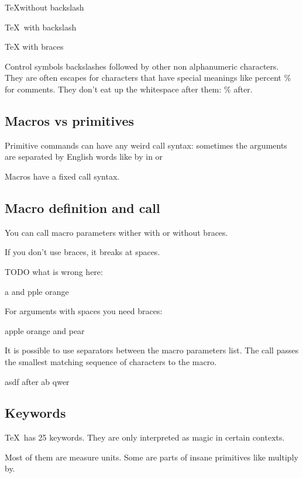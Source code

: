     \TeX without backslash

    \TeX\ with backslash

    \TeX{} with braces

    Control symbols backslashes followed by other non alphanumeric characters. They are often escapes for characters that have special meanings like percent \% for comments. They don't eat up the whitespace after them: \% after.

    \subsection{Macros vs primitives}

      Primitive commands can have any weird call syntax: sometimes the arguments are separated by English words like by in  or 

      Macros have a fixed call syntax.

    \subsection{Macro definition and call}

      You can call macro parameters wither with or without braces.

      If you don't use braces, it breaks at spaces.

      \def\f#1#2{#1 and #2}

      TODO what is wrong here:

      \f apple orange

      For arguments with spaces you need braces:

      \f{apple orange}{pear}

      It is possible to use separators between the macro parameters list. The call passes the smallest matching sequence of characters to the macro.

      \def\f#1ab#2{#1 after ab #2}

      \f{asdf}ab{qwer}

  \subsection{Keywords}

    \TeX\ has 25 keywords. They are only interpreted as magic in certain contexts.

    Most of them are measure units. Some are parts of insane primitives like multiply by.

